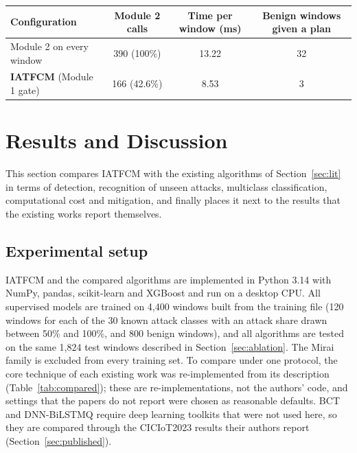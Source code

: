 \documentclass[]{interact}
\theoremstyle{plain}
\theoremstyle{definition}
\begin{document}
\begin{table}[htbp]
{\small
\begin{tabular}{lccc}
\toprule
Configuration & Module 2 calls & Time per window (ms) & Benign windows given a plan \\
\midrule
Module 2 on every window & 390 (100\%) & 13.22 & 32 \\
\textbf{IATFCM} (Module 1 gate) & 166 (42.6\%) & 8.53 & 3 \\
\bottomrule
\end{tabular}}
\label{tab:abl-gate}
\end{table}


\section{Results and Discussion}\label{sec:results}
This section compares IATFCM with the existing algorithms of Section~\ref{sec:lit} in terms of detection, recognition of unseen attacks, multiclass classification, computational cost and mitigation, and finally places it next to the results that the existing works report themselves.

\subsection{Experimental setup}
IATFCM and the compared algorithms are implemented in Python 3.14 with NumPy, pandas, scikit-learn and XGBoost and run on a desktop CPU. All supervised models are trained on 4,400 windows built from the training file (120 windows for each of the 30 known attack classes with an attack share drawn between 50\% and 100\%, and 800 benign windows), and all algorithms are tested on the same 1,824 test windows described in Section~\ref{sec:ablation}. The Mirai family is excluded from every training set. To compare under one protocol, the core technique of each existing work was re-implemented from its description (Table~\ref{tab:compared}); these are re-implementations, not the authors' code, and settings that the papers do not report were chosen as reasonable defaults. BCT and DNN-BiLSTMQ require deep learning toolkits that were not used here, so they are compared through the CICIoT2023 results their authors report (Section~\ref{sec:published}).
\end{document}
